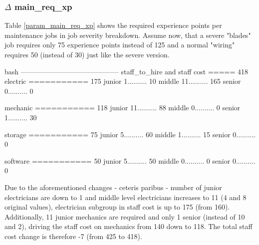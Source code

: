     \subsubsection{$\Delta$ main\_req\_xp}
    Table \ref{param_main_req_xp} shows the required experience points per maintenance jobs in job
    severity breakdown. Assume now, that a severe "blades" job requires only 75 experience points
    instead of 125 and a normal "wiring" requires 50 (instead of 30) just like the severe version.
    \bigskip
    \newline
        \vspace{2pt}
        \begin{boxminted}{bash}
            ------------------------------------------
            staff_to_hire and staff cost ===== 418
            electric   =========== 175
            junior     1.......... 10
            middle     11.......... 165
            senior     0.......... 0

            mechanic   =========== 118
            junior     11.......... 88
            middle     0.......... 0
            senior     1.......... 30

            storage   =========== 75
            junior     5.......... 60
            middle     1.......... 15
            senior     0.......... 0

            software   =========== 50
            junior     5.......... 50
            middle     0.......... 0
            senior     0.......... 0
        \end{boxminted}
    \newline
    Due to the aforementioned changes - ceteris paribus - number of junior electricians are down to 1
    and middle level electricians increases to 11 (4 and 8 original values), electrician subgroup 
    in staff cost is up to 175 (from 160). Additionally, 11 junior mechanics are required and only 1
    senior (instead of 10 and 2), driving the staff cost on mechanics from 140 down to 118. The total
    staff cost change is therefore -7 (from 425 to 418).  

